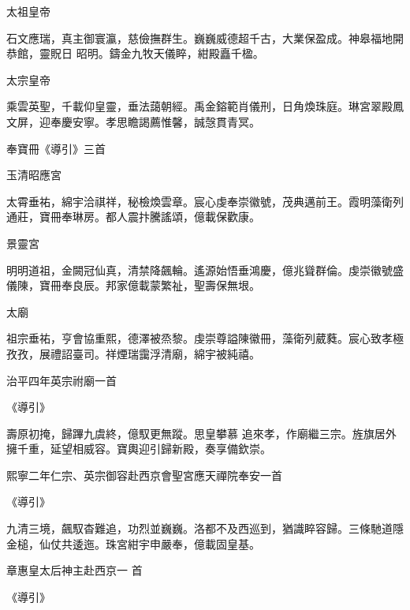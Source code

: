 \begin{pinyinscope}
 太祖皇帝



 石文應瑞，真主御寰瀛，慈儉撫群生。巍巍威德超千古，大業保盈成。神皋福地開恭館，靈貺日
 昭明。鑄金九牧天儀睟，紺殿矗千楹。



 太宗皇帝



 乘雲英聖，千載仰皇靈，垂法藹朝經。禹金鎔範肖儀刑，日角煥珠庭。琳宮翠殿鳳文屏，迎奉慶安寧。孝思瞻謁薦惟馨，誠愨貫青冥。



 奉寶冊《導引》三首



 玉清昭應宮



 太霄垂祐，綿宇洽祺祥，秘檢煥雲章。宸心虔奉崇徽號，茂典邁前王。霞明藻衛列通莊，寶冊奉琳房。都人震抃騰謠頌，億載保歡康。



 景靈宮



 明明道祖，金闕冠仙真，清禁降飆輪。遙源始悟垂鴻慶，億兆聳群倫。虔崇徽號盛儀陳，寶冊奉良辰。邦家億載蒙繁祉，聖壽保無垠。



 太廟



 祖宗垂祐，亨會協重熙，德澤被烝黎。虔崇尊謚陳徽冊，藻衛列葳蕤。宸心致孝極孜孜，展禮詔臺司。祥煙瑞靄浮清廟，綿宇被純禧。



 治平四年英宗祔廟一首



 《導引》



 壽原初掩，歸蹕九虞終，億馭更無蹤。思皇攀慕
 追來孝，作廟繼三宗。旌旗居外擁千重，延望相威容。寶輿迎引歸新殿，奏享備欽崇。



 熙寧二年仁宗、英宗御容赴西京會聖宮應天禪院奉安一首



 《導引》



 九清三境，飆馭杳難追，功烈並巍巍。洛都不及西巡到，猶識睟容歸。三條馳道隱金槌，仙仗共逶迤。珠宮紺宇申嚴奉，億載固皇基。



 章惠皇太后神主赴西京一
 首



 《導引》




\end{pinyinscope}
